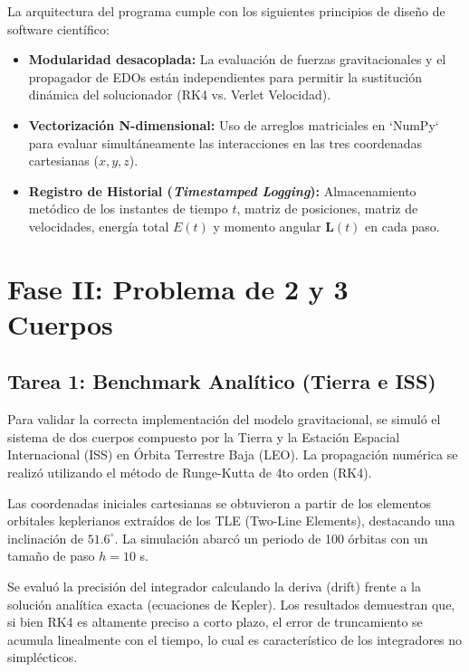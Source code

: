 \documentclass[11pt, a4paper]{article}
\begin{document}
	La arquitectura del programa cumple con los siguientes principios de diseño de software científico:
	\begin{itemize}
		\item \textbf{Modularidad desacoplada:} La evaluación de fuerzas gravitacionales y el propagador de EDOs están independientes para permitir la sustitución dinámica del solucionador (RK4 vs. Verlet Velocidad).
		\item \textbf{Vectorización N-dimensional:} Uso de arreglos matriciales en `NumPy` para evaluar simultáneamente las interacciones en las tres coordenadas cartesianas ($x, y, z$).
		\item \textbf{Registro de Historial (\textit{Timestamped Logging}):} Almacenamiento metódico de los instantes de tiempo $t$, matriz de posiciones, matriz de velocidades, energía total $E(t)$ y momento angular $\mathbf{L}(t)$ en cada paso.
	\end{itemize}
	
	\section{Fase II: Problema de 2 y 3 Cuerpos}
	
	\subsection{Tarea 1: Benchmark Analítico (Tierra e ISS)}
	
	Para validar la correcta implementación del modelo gravitacional, se simuló el sistema de dos cuerpos compuesto por la Tierra y la Estación Espacial Internacional (ISS) en Órbita Terrestre Baja (LEO). La propagación numérica se realizó utilizando el método de Runge-Kutta de 4to orden (RK4). 
	
	Las coordenadas iniciales cartesianas se obtuvieron a partir de los elementos orbitales keplerianos extraídos de los TLE (Two-Line Elements), destacando una inclinación de $51.6^\circ$. La simulación abarcó un periodo de 100 órbitas con un tamaño de paso $h = 10$ s.
	
	Se evaluó la precisión del integrador calculando la deriva (drift) frente a la solución analítica exacta (ecuaciones de Kepler). Los resultados demuestran que, si bien RK4 es altamente preciso a corto plazo, el error de truncamiento se acumula linealmente con el tiempo, lo cual es característico de los integradores no simplécticos.
	
\end{document}
